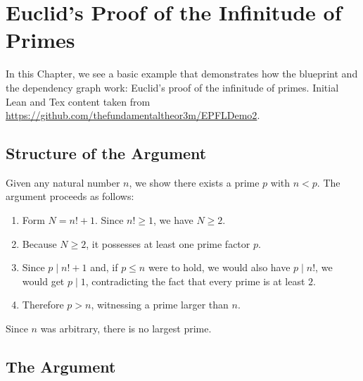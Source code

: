 %

\chapter{Euclid's Proof of the Infinitude of Primes}

In this Chapter, we see a basic example that demonstrates how the blueprint and the dependency graph work: Euclid's proof of the infinitude of primes. Initial Lean and Tex content taken from \url{https://github.com/thefundamentaltheor3m/EPFLDemo2}.

\section{Structure of the Argument}

Given any natural number $n$, we show there exists a prime $p$ with $n < p$.
The argument proceeds as follows:

\begin{enumerate}
  \item Form $N = n! + 1$. Since $n! ≥ 1$, we have $N ≥ 2$.
  \item Because $N ≥ 2$, it possesses at least one prime factor $p$.
  \item Since $p \mid n! + 1$ and, if $p ≤ n$ were to hold, we would also have $p \mid n!$, we would get $p ∣ 1$, contradicting the fact that every prime is at least $2$.
  \item Therefore $p > n$, witnessing a prime larger than $n$.
\end{enumerate}

Since $n$ was arbitrary, there is no largest prime.

\section{The Argument}

